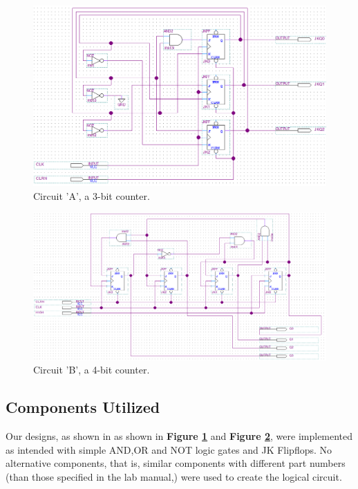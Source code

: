 \documentclass[a4paper,12pt]{article}
\begin{document}
\begin{figure}[H]
\includegraphics[width=\textwidth]{Images/LAB2_CircuitA.PNG} 
\caption{Circuit 'A', a 3-bit counter.}
\label{fig:CircA}
\end{figure}

\begin{figure}[H]
\includegraphics[width=\textwidth]{Images/LAB2_CircuitB.PNG} 
\caption{Circuit 'B', a 4-bit counter.}
\label{fig:CircB}
\end{figure}


\subsection{Components Utilized}

Our designs, as shown in as shown in \textbf{Figure \ref{fig:CircA}} and \textbf{Figure \ref{fig:CircB}}, were implemented as intended with simple AND,OR and NOT logic gates and JK Flipflops. No alternative components, that is, similar components with different part numbers (than those specified in the lab manual,) were used to create the logical circuit.
\end{document}
